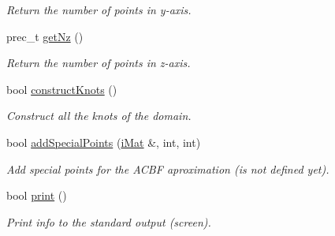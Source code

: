 \begin{CompactItemize}
\begin{CompactList}\small\item\em Return the number of points in y-axis. \item\end{CompactList}\item 
\hypertarget{classBoxKnots_7bb4fde2eb7acc71028d198974354763}{
prec\_\-t \hyperlink{classBoxKnots_7bb4fde2eb7acc71028d198974354763}{getNz} ()}
\label{classBoxKnots_7bb4fde2eb7acc71028d198974354763}

\begin{CompactList}\small\item\em Return the number of points in z-axis. \item\end{CompactList}\item 
bool \hyperlink{classBoxKnots_fe5f5142f80f351546584e3a0ad8e7eb}{constructKnots} ()
\begin{CompactList}\small\item\em Construct all the knots of the domain. \item\end{CompactList}\item 
\hypertarget{classBoxKnots_e7b3fff22211202e460dd851797196e6}{
bool \hyperlink{classBoxKnots_e7b3fff22211202e460dd851797196e6}{addSpecialPoints} (\hyperlink{Traits_8hpp_a667f32088e1c93b532a640fe84dc4cd}{iMat} \&, int, int)}
\label{classBoxKnots_e7b3fff22211202e460dd851797196e6}

\begin{CompactList}\small\item\em Add special points for the ACBF aproximation (is not defined yet). \item\end{CompactList}\item 
\hypertarget{classBoxKnots_3da4ed58cf073e403025476ca7402209}{
bool \hyperlink{classBoxKnots_3da4ed58cf073e403025476ca7402209}{print} ()}
\label{classBoxKnots_3da4ed58cf073e403025476ca7402209}

\begin{CompactList}\small\item\em Print info to the standard output (screen). \item\end{CompactList}\end{CompactItemize}
